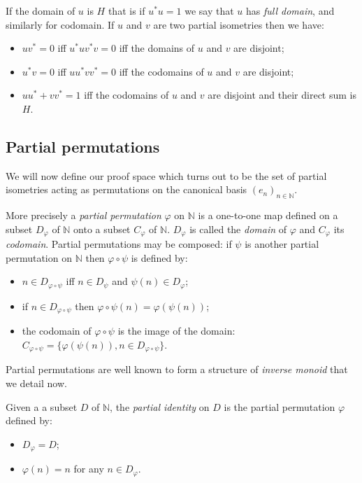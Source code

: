 If the domain of \(u\) is \(H\) that is if \(u^* u = 1\) we say that
\(u\) has \emph{full domain}, and similarly for codomain. If \(u\) and
\(v\) are two partial isometries then we have:
\begin{itemize}
\item \(uv^* = 0\) iff \(u^*uv^*v = 0\) iff the domains of \(u\) and \(v\)
  are disjoint;
\item \(u^*v = 0\) iff \(uu^*vv^* = 0\) iff the codomains of \(u\) and \(v\)
  are disjoint;
\item \(uu^* + vv^* = 1\) iff the codomains of \(u\) and \(v\) are disjoint
  and their direct sum is \(H\).
\end{itemize}


\subsection{Partial permutations}\label{partial-permutations}

We will now define our proof space which turns out to be the set of
partial isometries acting as permutations on the canonical basis
\((e_n)_{n\in\mathbb{N}}\).

More precisely a \emph{partial permutation} \(\varphi\) on
\(\mathbb{N}\) is a one-to-one map defined on a subset \(D_\varphi\) of
\(\mathbb{N}\) onto a subset \(C_\varphi\) of \(\mathbb{N}\).
\(D_\varphi\) is called the \emph{domain} of \(\varphi\) and
\(C_\varphi\) its \emph{codomain}. Partial permutations may be composed:
if \(\psi\) is another partial permutation on \(\mathbb{N}\) then
\(\varphi\circ\psi\) is defined by:
\begin{itemize}
\item \(n\in D_{\varphi\circ\psi}\) iff \(n\in D_\psi\) and
  \(\psi(n)\in D_\varphi\);
\item if \(n\in D_{\varphi\circ\psi}\) then
  \(\varphi\circ\psi(n) = \varphi(\psi(n))\);
\item the codomain of \(\varphi\circ\psi\) is the image of the domain:
  \(C_{\varphi\circ\psi} = \{\varphi(\psi(n)), n\in D_{\varphi\circ\psi}\}\).
\end{itemize}

Partial permutations are well known to form a structure of \emph{inverse
monoid} that we detail now.

Given a a subset \(D\) of \(\mathbb{N}\), the \emph{partial identity} on
\(D\) is the partial permutation \(\varphi\) defined by:
\begin{itemize}
\item \(D_\varphi = D\);
\item \(\varphi(n) = n\) for any \(n\in D_\varphi\).
\end{itemize}

